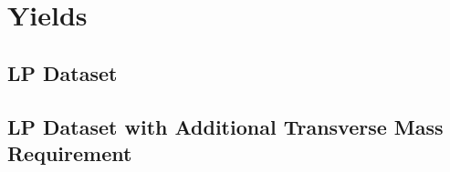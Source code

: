 \documentclass{cmspaper}
\begin{document}
\section{Yields}
%
%

%
\subsection{LP Dataset}


%
\subsection{LP Dataset with Additional Transverse Mass Requirement}

\end{document}
